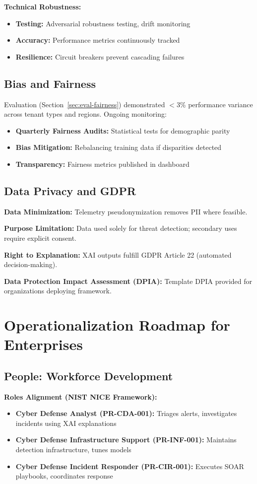 \textbf{Technical Robustness:}
\begin{itemize}
    \item \textbf{Testing:} Adversarial robustness testing, drift monitoring
    \item \textbf{Accuracy:} Performance metrics continuously tracked
    \item \textbf{Resilience:} Circuit breakers prevent cascading failures
\end{itemize}

\subsection{Bias and Fairness}
Evaluation (Section~\ref{sec:eval-fairness}) demonstrated $<$3\% performance variance across tenant types and regions. Ongoing monitoring:
\begin{itemize}
    \item \textbf{Quarterly Fairness Audits:} Statistical tests for demographic parity
    \item \textbf{Bias Mitigation:} Rebalancing training data if disparities detected
    \item \textbf{Transparency:} Fairness metrics published in dashboard
\end{itemize}

\subsection{Data Privacy and GDPR}
\textbf{Data Minimization:} Telemetry pseudonymization removes PII where feasible.

\textbf{Purpose Limitation:} Data used solely for threat detection; secondary uses require explicit consent.

\textbf{Right to Explanation:} XAI outputs fulfill GDPR Article 22 (automated decision-making).

\textbf{Data Protection Impact Assessment (DPIA):} Template DPIA provided for organizations deploying framework.

\section{Operationalization Roadmap for Enterprises}\label{sec:policy-operationalization}
\subsection{People: Workforce Development}
\textbf{Roles Alignment (NIST NICE Framework):}
\begin{itemize}
    \item \textbf{Cyber Defense Analyst (PR-CDA-001):} Triages alerts, investigates incidents using XAI explanations
    \item \textbf{Cyber Defense Infrastructure Support (PR-INF-001):} Maintains detection infrastructure, tunes models
    \item \textbf{Cyber Defense Incident Responder (PR-CIR-001):} Executes SOAR playbooks, coordinates response
\end{itemize}

